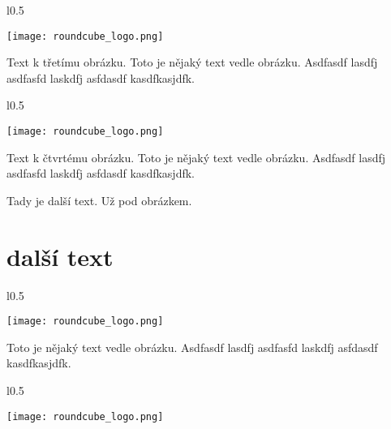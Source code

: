 \documentclass[12pt,a4paper,twoside]{book}
\begin{document}
\begin{wrapfigure}{l}{0.5\textwidth}
  \vspace{-20pt}
  \begin{center}
    \texttt{[image: roundcube\_logo.png]}
  \end{center}
  \vspace{-20pt}
\end{wrapfigure}

Text k třetímu obrázku. Toto je nějaký text vedle obrázku. Asdfasdf lasdfj asdfasfd laskdfj asfdasdf kasdfkasjdfk.
\newline

\begin{wrapfigure}{l}{0.5\textwidth}
  \vspace{-20pt}
  \begin{center}
    \texttt{[image: roundcube\_logo.png]}
  \end{center}
  \vspace{-20pt}
\end{wrapfigure}

Text k čtvrtému obrázku. Toto je nějaký text vedle obrázku. Asdfasdf lasdfj asdfasfd laskdfj asfdasdf kasdfkasjdfk.
\newline


Tady je další text. Už pod obrázkem.

\section{další  text}

\begin{wrapfigure}{l}{0.5\textwidth}
  \vspace{-30pt}
  \begin{center}
    \texttt{[image: roundcube\_logo.png]}
  \end{center}
  \vspace{-10pt}
\end{wrapfigure}

Toto je nějaký text vedle obrázku. Asdfasdf lasdfj asdfasfd laskdfj asfdasdf kasdfkasjdfk.
\newline

\begin{wrapfigure}{l}{0.5\textwidth}
  \vspace{-20pt}
  \begin{center}
    \texttt{[image: roundcube\_logo.png]}
  \end{center}
  \vspace{-20pt}
\end{wrapfigure}
\end{document}
